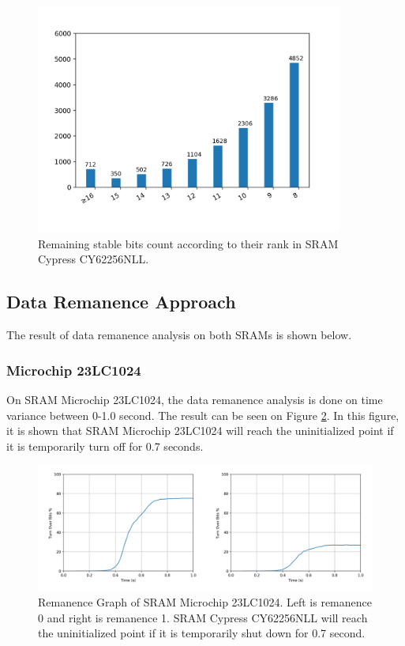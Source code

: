 \begin{figure}[tph!]
    \centerline{\includegraphics[width={0.9\textwidth}]{images/cy62256nll_score_rank_bits}}
    \caption{Remaining stable bits count according to their rank in SRAM Cypress CY62256NLL.}
    \label{fig:cy62256nll_score_rank_bits}
\end{figure}

\subsection{Data Remanence Approach}

The result of data remanence analysis on both SRAMs is shown below.

\subsubsection{Microchip 23LC1024}

On SRAM Microchip 23LC1024, the data remanence analysis is done on time variance between 0-1.0 second. The result can be seen on Figure \ref{fig:23lc1024-remanence0}. In this figure, it is shown that
SRAM Microchip 23LC1024 will reach the uninitialized point if it is temporarily turn off for 0.7 seconds.

\begin{figure}[tph!]
    \centerline{\includegraphics[width={\textwidth}]{images/remanence0}}
    \caption{Remanence Graph of SRAM Microchip 23LC1024. Left is remanence 0 and right is remanence 1. SRAM Cypress CY62256NLL will reach the uninitialized point if it is temporarily shut down for 0.7 second.}
    \label{fig:23lc1024-remanence0}
\end{figure}



